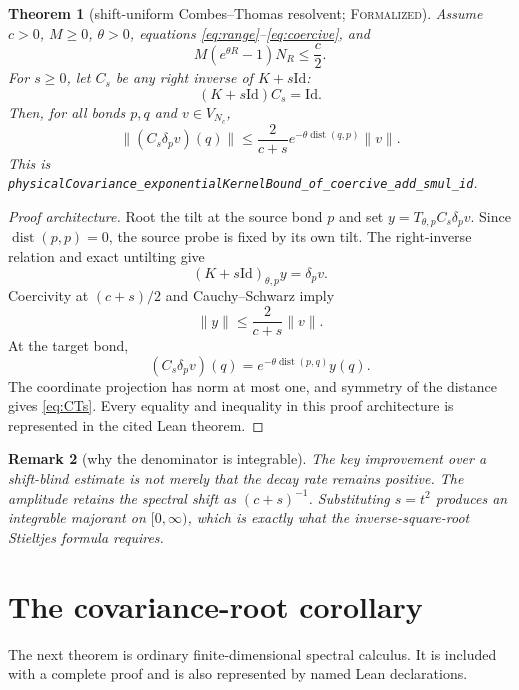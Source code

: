 \documentclass[11pt]{article}
\newtheorem{theorem}{Theorem}[section]
\newtheorem{remark}[theorem]{Remark}
\theoremstyle{definition}
\newcommand{\Id}{\mathrm{Id}}
\newcommand{\dist}{\operatorname{dist}}
\newcommand{\norm}[1]{\lVert #1\rVert}
\newcommand{\lean}[1]{\texttt{#1}}
\newcommand{\formalized}{\textsc{Formalized}}
\begin{document}
\begin{theorem}[shift-uniform Combes--Thomas resolvent; \formalized]
\label{thm:shiftedCT}
Assume $c>0$, $M\ge0$, $\theta>0$, equations
\eqref{eq:range}--\eqref{eq:coercive}, and
\begin{equation}\label{eq:budget}
  M(e^{\theta R}-1)N_R\le\frac c2.
\end{equation}
For $s\ge0$, let $C_s$ be any right inverse of $K+s\Id$:
\[
  (K+s\Id)C_s=\Id.
\]
Then, for all bonds $p,q$ and $v\in V_{N_c}$,
\begin{equation}\label{eq:CTs}
  \norm{(C_s\delta_pv)(q)}
  \le \frac{2}{c+s}
       e^{-\theta\dist(q,p)}\norm v.
\end{equation}
This is
\lean{physicalCovariance\_exponentialKernelBound\_of\_coercive\_add\_smul\_id}.
\end{theorem}

\begin{proof}[Proof architecture]
Root the tilt at the source bond $p$ and set
$y=T_{\theta,p}C_s\delta_pv$.  Since $\dist(p,p)=0$, the source probe is fixed
by its own tilt.  The right-inverse relation and exact untilting give
\[
  (K+s\Id)_{\theta,p}y=\delta_pv.
\]
Coercivity at $(c+s)/2$ and Cauchy--Schwarz imply
\[
  \norm y\le\frac{2}{c+s}\norm v.
\]
At the target bond,
\[
  (C_s\delta_pv)(q)=e^{-\theta\dist(p,q)}y(q).
\]
The coordinate projection has norm at most one, and symmetry of the distance
gives \eqref{eq:CTs}.  Every equality and inequality in this proof architecture
is represented in the cited Lean theorem.
\end{proof}

\begin{remark}[why the denominator is integrable]
The key improvement over a shift-blind estimate is not merely that the decay
rate remains positive.  The amplitude retains the spectral shift as
$(c+s)^{-1}$.  Substituting $s=t^2$ produces an integrable majorant on
$[0,\infty)$, which is exactly what the inverse-square-root Stieltjes formula
requires.
\end{remark}

\section{The covariance-root corollary}\label{sec:root}

The next theorem is ordinary finite-dimensional spectral calculus.  It is
included with a complete proof and is also represented by named Lean
declarations.
\end{document}
